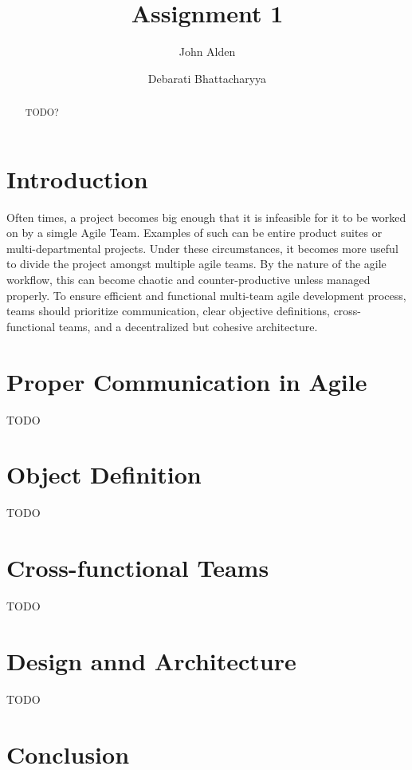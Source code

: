 \documentclass[sigplan,screen]{acmart}
\begin{document}
\title{Assignment 1}

%
%
\author{John Alden}

\author{Debarati Bhattacharyya}

%
%
\begin{abstract}
TODO?
\end{abstract}

%
%
\maketitle

%
%
\section{Introduction}
Often times, a project becomes big enough that it is infeasible for it to be worked on by a simgle Agile Team.
Examples of such can be entire product suites or multi-departmental projects.
Under these circumstances, it becomes more useful to divide the project amongst multiple agile teams.
By the nature of the agile workflow, this can become chaotic and counter-productive unless managed properly.
To ensure efficient and functional multi-team agile development process, teams should prioritize communication, clear objective definitions, cross-functional teams, and a decentralized but cohesive architecture.

\section{Proper Communication in Agile}
TODO

\section{Object Definition}
TODO

\section{Cross-functional Teams}
TODO

\section{Design annd Architecture}
TODO

\section{Conclusion}




\end{document}
